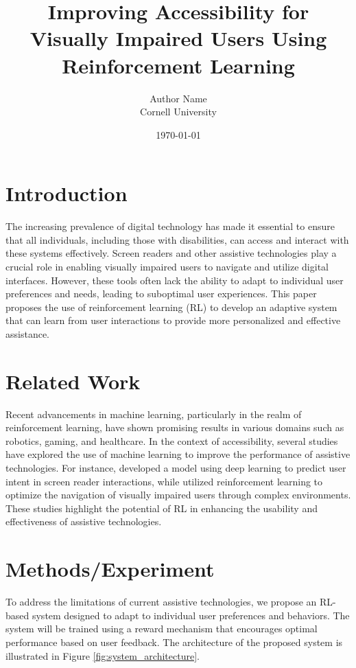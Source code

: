 \documentclass{article}
\title{Improving Accessibility for Visually Impaired Users Using Reinforcement Learning}
\author{Author Name \\ Cornell University}
\date{\today}
\begin{document}
\maketitle

\section{Introduction}
The increasing prevalence of digital technology has made it essential to ensure that all individuals, including those with disabilities, can access and interact with these systems effectively. Screen readers and other assistive technologies play a crucial role in enabling visually impaired users to navigate and utilize digital interfaces. However, these tools often lack the ability to adapt to individual user preferences and needs, leading to suboptimal user experiences. This paper proposes the use of reinforcement learning (RL) to develop an adaptive system that can learn from user interactions to provide more personalized and effective assistance.

\section{Related Work}
Recent advancements in machine learning, particularly in the realm of reinforcement learning, have shown promising results in various domains such as robotics, gaming, and healthcare. In the context of accessibility, several studies have explored the use of machine learning to improve the performance of assistive technologies. For instance, \cite{DBLP:journals/corr/abs-2103-11577} developed a model using deep learning to predict user intent in screen reader interactions, while \cite{DBLP:conf/access/SongJY21} utilized reinforcement learning to optimize the navigation of visually impaired users through complex environments. These studies highlight the potential of RL in enhancing the usability and effectiveness of assistive technologies.

\section{Methods/Experiment}
To address the limitations of current assistive technologies, we propose an RL-based system designed to adapt to individual user preferences and behaviors. The system will be trained using a reward mechanism that encourages optimal performance based on user feedback. The architecture of the proposed system is illustrated in Figure \ref{fig:system_architecture}. 
\end{document}
